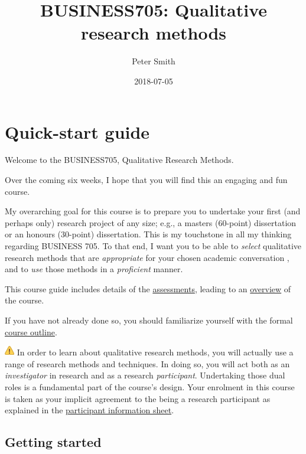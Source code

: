 \documentclass[]{book}
\title{BUSINESS705: Qualitative research methods}
\author{Peter Smith}
\date{2018-07-05}
\theoremstyle{definition}
\theoremstyle{definition}
\theoremstyle{definition}
\theoremstyle{remark}
\begin{document}
\maketitle

{
\setcounter{tocdepth}{1}
\tableofcontents
}
\hypertarget{quick-start-guide}{%
\chapter*{Quick-start guide}\label{quick-start-guide}}

Welcome to the BUSINESS705, Qualitative Research Methods.

Over the coming six weeks, I hope that you will find this an engaging
and fun course.

My overarching goal for this course is to prepare you to undertake your
first (and perhaps only) research project of any size; e.g., a masters
(60-point) dissertation or an honours (30-point) dissertation. This is
my touchstone in all my thinking regarding BUSINESS 705. To that end, I
want you to be able to \emph{select} qualitative research methods that
are \emph{appropriate} for your chosen academic conversation
\autocite{huff_2009_designingresearchpublication}, and to \emph{use}
those methods in a \emph{proficient} manner.

This course guide includes details of the
\protect\hyperlink{assessment-overview}{assessments}, leading to an
\protect\hyperlink{course-overview}{overview} of the course.

If you have not already done so, you should familiarize yourself with
the formal \protect\hyperlink{course-outline}{course outline}.

\includegraphics{images/warning.png} In order to learn about qualitative
research methods, you will actually use a range of research methods and
techniques. In doing so, you will act both as an \emph{investigator} in
research and as a research \emph{participant}. Undertaking those dual
roles is a fundamental part of the course's design. Your enrolment in
this course is taken as your implicit agreement to the being a research
participant as explained in the \protect\hyperlink{pis}{participant
information sheet}.

\hypertarget{getting-started}{%
\section*{Getting started}\label{getting-started}}
\end{document}
